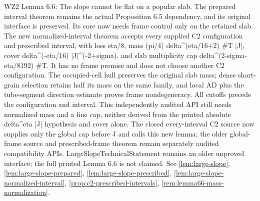 \begin{remark}
\label{rem:atlas-W2L6_6}
WZ2 Lemma 6.6: The slope cannot be flat on a popular slab.
The prepared interval theorem remains the actual Proposition 6.5 dependency, and its original interface is preserved. Its core now needs frame control only on the retained slab. The new normalized-interval theorem accepts every supplied C2 configuration and prescribed interval, with loss eta/8, mass (pi/4) delta\textasciicircum{}(eta/16+2) \#T |J|, cover delta\textasciicircum{}(-eta/16) |J|\textasciicircum{}(-2+sigma), and slab multiplicity cap delta\textasciicircum{}(2-sigma-eta/8192) \#T. It has no frame premise and does not choose another C2 configuration. The occupied-cell hull preserves the original slab mass; dense short-grain selection retains half its mass on the same family, and local AD plus the tube-segment direction estimate proves frame nondegeneracy. All cutoffs precede the configuration and interval. This independently audited API still needs normalized mass and a fine cap, neither derived from the printed absolute delta\textasciicircum{}eta |J| hypothesis and cover alone. The closed every-interval C2 source now supplies only the global cap before J and calls this new lemma; the older global-frame source and prescribed-frame theorem remain separately audited compatibility APIs. LargeSlopeTechnicalStatement remains an older unproved interface; the full printed Lemma 6.6 is not claimed.
See \ref{lem:large-slope}, \ref{lem:large-slope-prepared}, \ref{lem:large-slope-prescribed}, \ref{lem:large-slope-normalized-interval}, \ref{prop:c2-prescribed-intervals}, \ref{rem:lemma66-mass-normalization}.
\end{remark}

